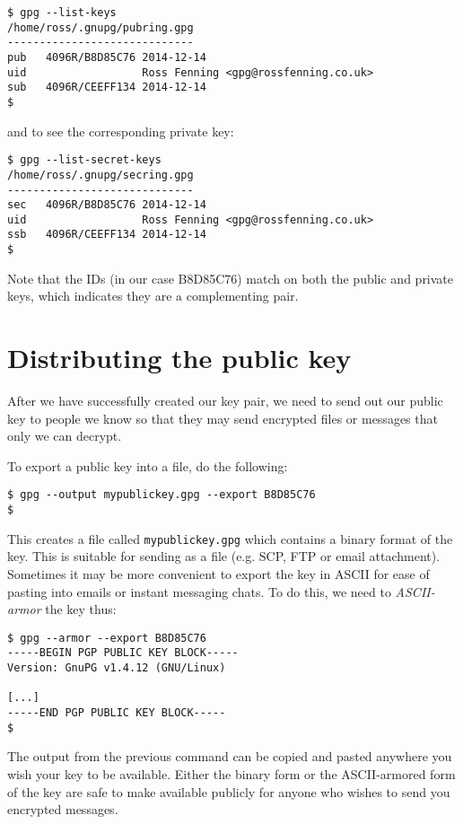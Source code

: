 \documentclass{report}
\begin{document}
\begin{lstlisting}
$ gpg --list-keys
/home/ross/.gnupg/pubring.gpg
-----------------------------
pub   4096R/B8D85C76 2014-12-14
uid                  Ross Fenning <gpg@rossfenning.co.uk>
sub   4096R/CEEFF134 2014-12-14
$
\end{lstlisting}

\noindent and to see the corresponding private key:

\begin{lstlisting}
$ gpg --list-secret-keys
/home/ross/.gnupg/secring.gpg
-----------------------------
sec   4096R/B8D85C76 2014-12-14
uid                  Ross Fenning <gpg@rossfenning.co.uk>
ssb   4096R/CEEFF134 2014-12-14
$
\end{lstlisting}

Note that the IDs (in our case B8D85C76) match on both the public
and private keys, which indicates they are a complementing pair.

\section{Distributing the public key}

After we have successfully created our key pair, we need to send
out our public key to people we know so that they may send
encrypted files or messages that only we can decrypt.

To export a public key into a file, do the following:

\begin{lstlisting}
$ gpg --output mypublickey.gpg --export B8D85C76
$
\end{lstlisting}

This creates a file called \texttt{mypublickey.gpg} which contains
a binary format of the key. This is suitable for sending as a file
(e.g. SCP, FTP or email attachment). Sometimes it may be more
convenient to export the key in ASCII for ease of pasting into emails
or instant messaging chats. To do this, we need to \emph{ASCII-armor}
the key thus:

\begin{lstlisting}
$ gpg --armor --export B8D85C76
-----BEGIN PGP PUBLIC KEY BLOCK-----
Version: GnuPG v1.4.12 (GNU/Linux)

[...]
-----END PGP PUBLIC KEY BLOCK-----
$
\end{lstlisting}

The output from the previous command can be copied and pasted anywhere
you wish your key to be available. Either the binary form or the
ASCII-armored form of the key are safe to make available publicly for
anyone who wishes to send you encrypted messages.
\end{document}
